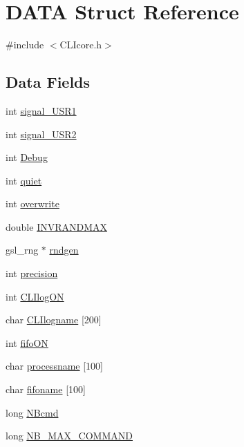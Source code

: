\hypertarget{structDATA}{\section{D\+A\+T\+A Struct Reference}
\label{structDATA}
}


{\ttfamily \#include $<$C\+L\+Icore.\+h$>$}

\subsection*{Data Fields}
\begin{DoxyCompactItemize}
\item 
int \hyperlink{structDATA_a64bae9d671e98229a54fea43d5d4f9b5}{signal\+\_\+\+U\+S\+R1}
\item 
int \hyperlink{structDATA_a2be71623c71eb07003ff60f14240b31a}{signal\+\_\+\+U\+S\+R2}
\item 
int \hyperlink{structDATA_a8148a9459923d124f03989f0c796e137}{Debug}
\item 
int \hyperlink{structDATA_a3f7eda27560572dd2510250a1935deb5}{quiet}
\item 
int \hyperlink{structDATA_a600cb8c85d463a76ca1dfe9d0097c8f3}{overwrite}
\item 
double \hyperlink{structDATA_aa17d253cb7412ac4cbc8f034dfe78308}{I\+N\+V\+R\+A\+N\+D\+M\+A\+X}
\item 
gsl\+\_\+rng $\ast$ \hyperlink{structDATA_a819c0e911d771dbb7da0dbf26e993fc2}{rndgen}
\item 
int \hyperlink{structDATA_a7b6fce0fc9e6046ffa57b30b8bcd0d1f}{precision}
\item 
int \hyperlink{structDATA_abfc40a5bf0093716bcc793aca3ec678c}{C\+L\+Ilog\+O\+N}
\item 
char \hyperlink{structDATA_aa491474d93756c181862fb907c777b78}{C\+L\+Ilogname} \mbox{[}200\mbox{]}
\item 
int \hyperlink{structDATA_a37b44a7ef0d3d29f33bf3700ec28665e}{fifo\+O\+N}
\item 
char \hyperlink{structDATA_a58978653cfb98eaf9b9007cb992cc0e4}{processname} \mbox{[}100\mbox{]}
\item 
char \hyperlink{structDATA_ac3b98b39c316089481ab31820a1f4b21}{fifoname} \mbox{[}100\mbox{]}
\item 
long \hyperlink{structDATA_ab3ecb17b2561794d854efcbc47584b19}{N\+Bcmd}
\item 
long \hyperlink{structDATA_afc7d56480cf2e6f4b91ed95be0466d44}{N\+B\+\_\+\+M\+A\+X\+\_\+\+C\+O\+M\+M\+A\+N\+D}

\end{DoxyCompactItemize}
